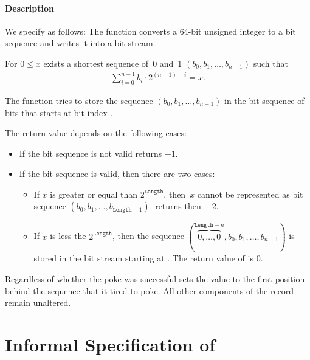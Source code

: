 \paragraph{Description}

We specify \pokenext as follows:
The function \poke converts a 64-bit unsigned integer to a bit sequence and 
writes it into a bit stream.

For $0 \leq x$ exists a shortest sequence of~0 and~1
$(b_0, b_1,\ldots,b_{n - 1})$
such that
\begin{align}
    \sum_{i=0}^{n-1} b_i \cdot 2^{(n - 1) - i} = x.
\end{align}

The function \pokenext tries to store the sequence $(b_0, b_1,\ldots,b_{n - 1})$
in the bit sequence of  bits that starts
at bit index .

The return value depends on  the following cases:
\begin{itemize}
    \item  If the bit sequence is not valid \peeknext  returns $-1$.
    \item  If the bit sequence is valid, then there are two cases:
\begin{itemize}
\item
If $x$ is greater or equal than $2^\mathtt{Length}$, then~$x$
cannot be represented as bit sequence $(b_0, b_1,\ldots,b_{\mathtt{Length} - 1})$.
\pokenext returns then~$-2$.

\item
If $x$ is less the $2^{\mathtt{Length}}$, then  the sequence
$(\overbrace{0,\ldots,0}^{\mathtt{Length}-n},b_0, b_1,\ldots,b_{n - 1})$
is stored in the bit stream starting at .
The return value of \pokenext is 0.

\end{itemize}
\end{itemize}

Regardless of whether the poke was successful \pokenext sets the value   to the first position behind the sequence that it tired to poke.
 All other components of the record  remain unaltered.


\clearpage

\section{Informal Specification of }


